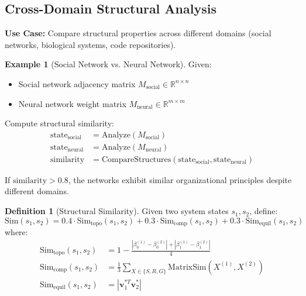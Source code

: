 \documentclass[11pt,a4paper]{article}
\theoremstyle{definition}
\newtheorem{definition}[theorem]{Definition}
\newtheorem{example}[theorem]{Example}
\theoremstyle{remark}
\newcommand{\R}{\mathbb{R}}
\newcommand{\abs}[1]{\left|#1\right|}
\begin{document}
\subsection{Cross-Domain Structural Analysis}

\textbf{Use Case:} Compare structural properties across different domains (social networks, biological systems, code repositories).

\begin{example}[Social Network vs. Neural Network]
Given:
\begin{itemize}
\item Social network adjacency matrix $M_{\text{social}} \in \R^{n \times n}$
\item Neural network weight matrix $M_{\text{neural}} \in \R^{m \times m}$
\end{itemize}

Compute structural similarity:
\begin{align}
\text{state}_{\text{social}} &= \text{Analyze}(M_{\text{social}}) \\
\text{state}_{\text{neural}} &= \text{Analyze}(M_{\text{neural}}) \\
\text{similarity} &= \text{CompareStructures}(\text{state}_{\text{social}}, \text{state}_{\text{neural}})
\end{align}

If $\text{similarity} > 0.8$, the networks exhibit similar organizational principles despite different domains.
\end{example}

\begin{definition}[Structural Similarity]\label{def:similarity}
Given two system states $s_1, s_2$, define:
\begin{equation}
\text{Sim}(s_1, s_2) = 0.4 \cdot \text{Sim}_{\text{topo}}(s_1, s_2) + 0.3 \cdot \text{Sim}_{\text{comp}}(s_1, s_2) + 0.3 \cdot \text{Sim}_{\text{equil}}(s_1, s_2)
\end{equation}
where:
\begin{align}
\text{Sim}_{\text{topo}}(s_1, s_2) &= 1 - \frac{\abs{\beta_0^{(1)} - \beta_0^{(2)}} + \abs{\beta_1^{(1)} - \beta_1^{(2)}}}{4} \\
\text{Sim}_{\text{comp}}(s_1, s_2) &= \frac{1}{3}\sum_{X \in \{S,R,G\}} \text{MatrixSim}(X^{(1)}, X^{(2)}) \\
\text{Sim}_{\text{equil}}(s_1, s_2) &= \abs{\mathbf{v}_1^{*T} \mathbf{v}_2^*}
\end{align}
\end{definition}
\end{document}
